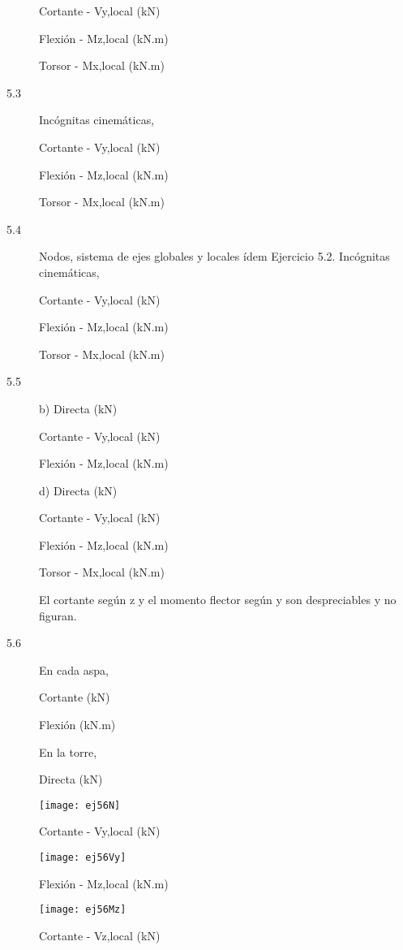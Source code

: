 \begin{description}
Cortante - Vy,local (kN)


Flexión - Mz,local (kN.m)

Torsor - Mx,local (kN.m)


\item[5.3]


Incógnitas cinemáticas,





Cortante - Vy,local (kN)


Flexión - Mz,local (kN.m)

Torsor - Mx,local (kN.m)

\item[5.4]


Nodos, sistema de ejes globales y locales ídem Ejercicio 5.2.
Incógnitas cinemáticas,




Cortante - Vy,local (kN)

Flexión - Mz,local (kN.m)

Torsor - Mx,local (kN.m)

\item[5.5]


b)
Directa (kN)

Cortante - Vy,local (kN)

Flexión - Mz,local (kN.m)

d)
Directa (kN)

Cortante - Vy,local (kN)



Flexión - Mz,local (kN.m)

Torsor - Mx,local (kN.m)


El cortante según z y el momento flector según y son despreciables y no figuran. 


\item[5.6]

En cada aspa,

Cortante (kN)


Flexión (kN.m)


En la torre,

Directa (kN)

	\texttt{[image: ej56N]}

Cortante - Vy,local (kN)

	\texttt{[image: ej56Vy]}

Flexión - Mz,local (kN.m)

	\texttt{[image: ej56Mz]}

Cortante - Vz,local (kN)


\end{description}
